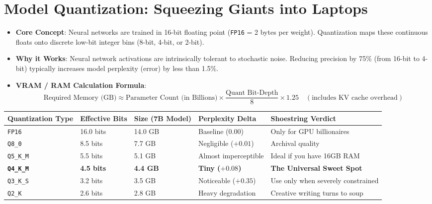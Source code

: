 \documentclass[11pt,a4paper]{article}
\begin{document}
\section{Model Quantization: Squeezing Giants into Laptops}
\begin{itemize}
    \item \textbf{Core Concept}: Neural networks are trained in 16-bit floating point (\texttt{FP16} = 2 bytes per weight). Quantization maps these continuous floats onto discrete low-bit integer bins (8-bit, 4-bit, or 2-bit).
    \item \textbf{Why it Works}: Neural network activations are intrinsically tolerant to stochastic noise. Reducing precision by 75\% (from 16-bit to 4-bit) typically increases model perplexity (error) by less than 1.5\%.
    \item \textbf{VRAM / RAM Calculation Formula}:
    \[
    \text{Required Memory (GB)} \approx \text{Parameter Count (in Billions)} \times \frac{\text{Quant Bit-Depth}}{8} \times 1.25 \quad (\text{includes KV cache overhead})
    \]
\end{itemize}

\begin{center}
\small
\begin{tabular}{lllll}
\toprule
\textbf{Quantization Type} & \textbf{Effective Bits} & \textbf{Size (7B Model)} & \textbf{Perplexity Delta} & \textbf{Shoestring Verdict} \\
\midrule
\texttt{FP16} & 16.0 bits & 14.0 GB & Baseline (0.00) & Only for GPU billionaires \\
\texttt{Q8\_0} & 8.5 bits & 7.7 GB & Negligible ($+0.01$) & Archival quality \\
\texttt{Q5\_K\_M} & 5.5 bits & 5.1 GB & Almost imperceptible & Ideal if you have 16GB RAM \\
\textbf{\texttt{Q4\_K\_M}} & \textbf{4.5 bits} & \textbf{4.4 GB} & \textbf{Tiny ($+0.08$)} & \textbf{The Universal Sweet Spot} \\
\texttt{Q3\_K\_S} & 3.2 bits & 3.5 GB & Noticeable ($+0.35$) & Use only when severely constrained \\
\texttt{Q2\_K} & 2.6 bits & 2.8 GB & Heavy degradation & Creative writing turns to soup \\
\bottomrule
\end{tabular}
\end{center}
\end{document}
